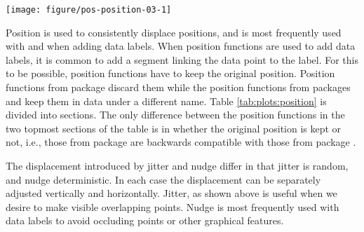 \documentclass[krantz2]{krantz}\usepackage{knitr}
\begin{document}
\begin{knitrout}\footnotesize
{}\color{fgcolor}\begin{kframe}
\begin{alltt}
 \hlkwb{<-}  \hlopt{+} \hlstd{(} \hlstd{=} \hlstd{,}  \hlstd{=} \hlstd{,}  \hlstd{=} \hlstd{)} \hlopt{+}
  \hlstd{(}\hlstd{)}
 \hlkwb{<-}  \hlopt{+} \hlstd{(} \hlstd{=} \hlstd{,}  \hlstd{=} \hlstd{,}  \hlstd{=} \hlstd{)} \hlopt{+}
  \hlstd{(}\hlstd{)}
\end{alltt}
\end{kframe}
\end{knitrout}

\begin{knitrout}\footnotesize
{}\color{fgcolor}\begin{kframe}
\begin{alltt}
 \hlopt{+} 
\end{alltt}
\end{kframe}

{\centering \texttt{[image: figure/pos-position-03-1]} 

}


\end{knitrout}

Position  is used to consistently displace positions, and is most frequently used with  and  when adding data labels. When position functions are used to add data labels, it is common to add a segment linking the data point to the label. For this to be possible, position functions have to keep the original position. Position functions from package \ggplot discard them while the position functions from packages \ggpp and \ggrepel keep them in data under a different name. Table \ref{tab:plots:position} is divided into sections. The only difference between the position functions in the two topmost sections of the table is in whether the original position is kept or not, i.e., those from package \ggpp are backwards compatible with those from package \ggplot.

The displacement introduced by jitter and nudge differ in that jitter is random, and nudge deterministic. In each case the displacement can be separately adjusted vertically and horizontally. Jitter, as shown above is useful when we desire to make visible overlapping points. Nudge is most frequently used with data labels to avoid occluding points or other graphical features.
\end{document}
